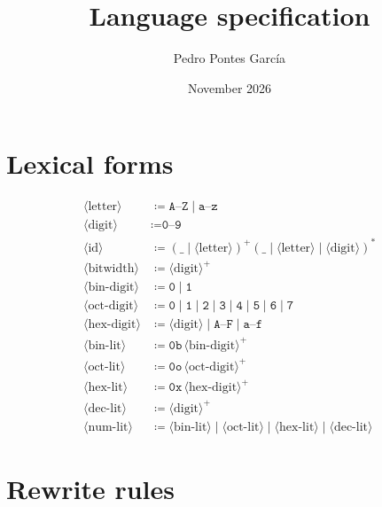 \documentclass[letterpaper]{article}
\title{Language specification}
\author{Pedro Pontes García}
\date{November 2026}
\begin{document}
\maketitle

\section*{Lexical forms}

\begin{align*}
\langle\text{letter}\rangle
  &\coloneqq \texttt{A}\text{--}\texttt{Z} \mid \texttt{a}\text{--}\texttt{z} \\
\langle\text{digit}\rangle
  &\coloneqq \texttt{0}\text{--}\texttt{9} \\
\langle\text{id}\rangle
  &\coloneqq (\texttt{\_} \mid \langle\text{letter}\rangle)^+
          (\texttt{\_} \mid \langle\text{letter}\rangle \mid \langle\text{digit}\rangle)^* \\
\langle\text{bitwidth}\rangle
  &\coloneqq \langle\text{digit}\rangle^+ \\
\langle\text{bin-digit}\rangle
  &\coloneqq \texttt{0} \mid \texttt{1} \\
\langle\text{oct-digit}\rangle
  &\coloneqq \texttt{0} \mid \texttt{1} \mid \texttt{2} \mid \texttt{3}
          \mid \texttt{4} \mid \texttt{5} \mid \texttt{6} \mid \texttt{7} \\
\langle\text{hex-digit}\rangle
  &\coloneqq \langle\text{digit}\rangle \mid \texttt{A}\text{--}\texttt{F} \mid \texttt{a}\text{--}\texttt{f} \\
\langle\text{bin-lit}\rangle
  &\coloneqq \texttt{0b}\,\langle\text{bin-digit}\rangle^+ \\
\langle\text{oct-lit}\rangle
  &\coloneqq \texttt{0o}\,\langle\text{oct-digit}\rangle^+ \\
\langle\text{hex-lit}\rangle
  &\coloneqq \texttt{0x}\,\langle\text{hex-digit}\rangle^+ \\
\langle\text{dec-lit}\rangle
  &\coloneqq \langle\text{digit}\rangle^+ \\
\langle\text{num-lit}\rangle
  &\coloneqq \langle\text{bin-lit}\rangle \mid \langle\text{oct-lit}\rangle
          \mid \langle\text{hex-lit}\rangle \mid \langle\text{dec-lit}\rangle
\end{align*}

\section*{Rewrite rules}
\end{document}
